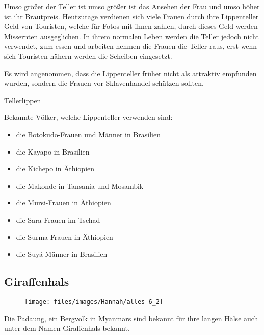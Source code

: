 Umso größer der Teller ist umso größer ist das Ansehen der Frau und umso höher ist ihr Brautpreis.
Heutzutage verdienen sich viele Frauen durch ihre Lippenteller Geld von Touristen, welche für Fotos
mit ihnen zahlen, durch dieses Geld werden Missernten ausgeglichen. In ihrem normalen Leben werden
die Teller jedoch nicht verwendet, zum essen und arbeiten nehmen die Frauen die Teller raus, erst
wenn sich Touristen nähern werden die Scheiben eingesetzt.

Es wird angenommen, dass die Lippenteller früher nicht als attraktiv empfunden wurden, sondern die
Frauen vor Sklavenhandel schützen sollten.

\begin{figurewrapper} %
	 \hfill
	\caption{Tellerlippen}
\end{figurewrapper}

\newpage
Bekannte Völker, welche Lippenteller verwenden sind:
\begin{multicols}{2}
\begin{itemize}
	\item die Botokudo-Frauen und Männer in Brasilien
	\item die Kayapo in Brasilien
	\item die Kichepo in Äthiopien
	\item die Makonde in Tansania und Mosambik
	\item die Mursi-Frauen in Äthiopien
	\item die Sara-Frauen im Tschad
	\item die Surma-Frauen in Äthiopien
	\item die Suyá-Männer in Brasilien
\end{itemize}
\end{multicols}

\subsection{Giraffenhals}
\begin{wrapfigure}{r}{0pt}
	\texttt{[image: files/images/Hannah/alles-6\_2]}%
\end{wrapfigure}

Die Padaung, ein Bergvolk in Myanmars sind bekannt für ihre langen Hälse auch unter dem Namen
Giraffenhals bekannt.

